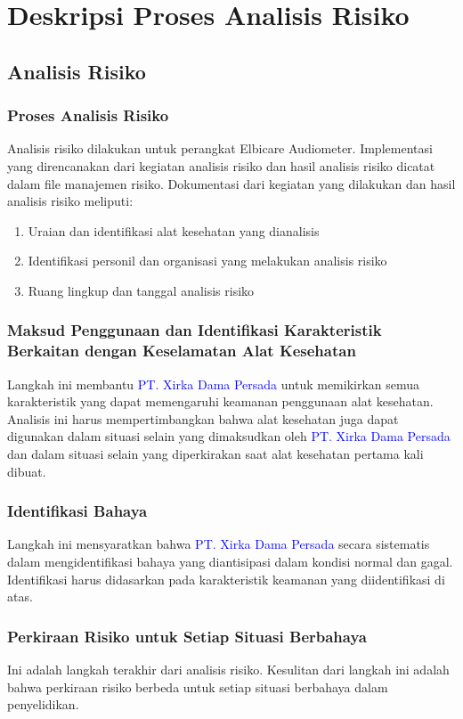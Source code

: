 \documentclass[11pt,a4paper,twoside,onecolumn]{book}
\begin{document}
	\chapter{Deskripsi Proses Analisis Risiko}
		\section{Analisis Risiko}
			\subsection{Proses Analisis Risiko}
			Analisis risiko dilakukan untuk perangkat Elbicare Audiometer. Implementasi yang direncanakan dari kegiatan analisis risiko dan hasil analisis risiko dicatat dalam file manajemen risiko. Dokumentasi dari kegiatan yang dilakukan dan hasil analisis risiko meliputi:
			\begin{enumerate}
				\item Uraian dan identifikasi alat kesehatan yang dianalisis
				\item Identifikasi personil dan organisasi yang melakukan analisis risiko
				\item Ruang lingkup dan tanggal analisis risiko
			\end{enumerate}
		
			\subsection{Maksud Penggunaan dan Identifikasi Karakteristik Berkaitan dengan Keselamatan Alat Kesehatan}
			Langkah ini membantu \textcolor{blue}{PT. Xirka Dama Persada} untuk memikirkan semua karakteristik yang dapat memengaruhi keamanan penggunaan alat kesehatan. Analisis ini harus mempertimbangkan bahwa alat kesehatan juga dapat digunakan dalam situasi selain yang dimaksudkan oleh \textcolor{blue}{PT. Xirka Dama Persada} dan dalam situasi selain yang diperkirakan saat alat kesehatan pertama kali dibuat.
			
			\subsection{Identifikasi Bahaya}
			Langkah ini mensyaratkan bahwa \textcolor{blue}{PT. Xirka Dama Persada} secara sistematis dalam mengidentifikasi bahaya yang diantisipasi dalam kondisi normal dan gagal. Identifikasi harus didasarkan pada karakteristik keamanan yang diidentifikasi di atas.
			
			\subsection{Perkiraan Risiko untuk Setiap Situasi Berbahaya}
			Ini adalah langkah terakhir dari analisis risiko. Kesulitan dari langkah ini adalah bahwa perkiraan risiko berbeda untuk setiap situasi berbahaya dalam penyelidikan.
			
\end{document}
